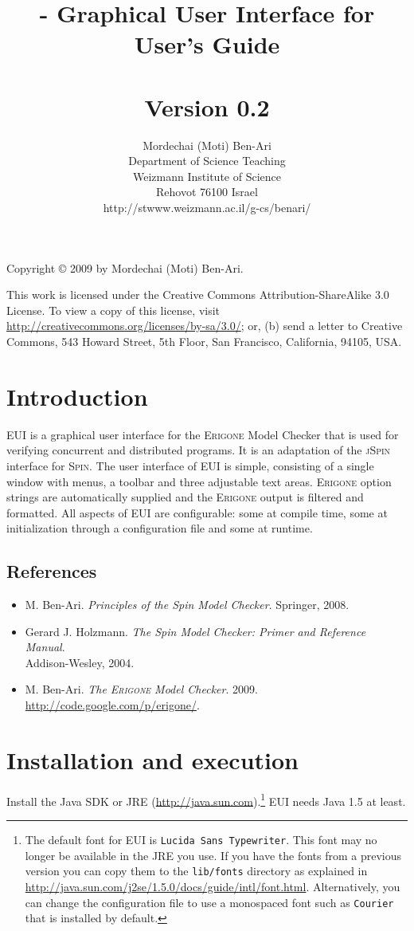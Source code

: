 \documentclass[11pt]{article}
\title{\eui{} - Graphical User Interface for \eri{}\\User's Guide\\\mbox{}\\\large{Version 0.2}}
\author{Mordechai (Moti) Ben-Ari\\
Department of Science Teaching\\
Weizmann Institute of Science\\
Rehovot 76100 Israel\\
\textsf{http://stwww.weizmann.ac.il/g-cs/benari/}}
\newcommand{\spn}{\textsc{Spin}}
\newcommand{\eri}{\textsc{Erigone}}
\newcommand{\eui}{\textsc{EUI}}
\newcommand{\js}{\textsc{jSpin}}
\newcommand{\p}[1]{\texttt{#1}}
\begin{document}
\maketitle
\thispagestyle{empty}

\vfill

\begin{center}
Copyright \copyright{} 2009 by Mordechai (Moti) Ben-Ari.
\end{center}

This work is licensed under the Creative Commons Attribution-ShareAlike 3.0
License. To view a copy of this license, visit
\url{http://creativecommons.org/licenses/by-sa/3.0/}; or, (b) send a letter
to Creative Commons, 543 Howard Street, 5th Floor, San Francisco,
California, 94105, USA.

\newpage

\section{Introduction}

\eui{} is a graphical user interface for the \eri{} Model Checker that is
used for verifying concurrent and distributed programs. It is an adaptation
of the \js{} interface for \spn{}.
The user interface of \eui{} is simple, consisting of a single window
with menus, a toolbar and three adjustable text areas. \eri{} option
strings are automatically supplied and the \eri{} output is filtered and
formatted. All aspects of \eui{} are configurable: some at compile time,
some at initialization through a configuration file and some at runtime.

\subsection{References}
\begin{itemize}
\item M. Ben-Ari. \textit{Principles of the Spin Model Checker}. Springer, 2008.
\item Gerard J. Holzmann. \textit{The Spin Model Checker: Primer
and Reference Manual}.\\Addison-Wesley, 2004.
\item M. Ben-Ari. \textit{The \eri{} Model Checker}. 2009.
\url{http://code.google.com/p/erigone/}.
\end{itemize}

\section{Installation and execution}
Install the Java SDK or JRE (\url{http://java.sun.com}).\footnote{The
default font for \eui{} is \p{Lucida Sans Typewriter}. This font may no longer be
available in the JRE you use. If you have the fonts from a previous version you
can copy them to the \p{lib/fonts} directory as explained in
\url{http://java.sun.com/j2se/1.5.0/docs/guide/intl/font.html}. Alternatively,
you can change the configuration file to use a monospaced font such as
\p{Courier} that is installed by default.} \eui{} needs Java 1.5 at least.
\end{document}
